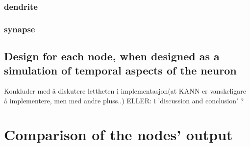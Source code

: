 		\subsubsection{dendrite}
		\subsubsection{synapse}
	\subsection{Design for each node, when designed as a simulation of temporal aspects of the neuron}
	
	Konkluder med å diskutere lettheten i implementasjon(at KANN er vanskeligare å implementere, men med andre pluss..) 			ELLER:   i 'discussion and conclusion' ?

\section{Comparison of the nodes' output}
